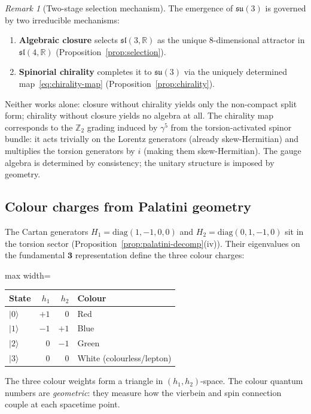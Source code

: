 \documentclass[12pt,a4paper]{article}
\theoremstyle{plain}
\theoremstyle{definition}
\theoremstyle{remark}
\newtheorem{remark}[theorem]{Remark}
\begin{document}
\begin{remark}[Two-stage selection mechanism]\label{rem:two-stage}
The emergence of $\mathfrak{su}(3)$ is governed by two irreducible mechanisms:
\begin{enumerate}[label=(\arabic*),noitemsep]
  \item \textbf{Algebraic closure} selects $\mathfrak{sl}(3,\mathbb{R})$ as the
    unique 8-dimensional attractor in $\mathfrak{sl}(4,\mathbb{R})$
    (Proposition~\ref{prop:selection}).
  \item \textbf{Spinorial chirality} completes it to $\mathfrak{su}(3)$ via the
    uniquely determined map~\eqref{eq:chirality-map}
    (Proposition~\ref{prop:chirality}).
\end{enumerate}
Neither works alone: closure without chirality yields only the non-compact
split form; chirality without closure yields no algebra at all.
The chirality map corresponds to the $\mathbb{Z}_2$ grading induced by
$\gamma^5$ from the torsion-activated spinor bundle: it acts trivially on the
Lorentz generators (already skew-Hermitian) and multiplies the torsion generators
by $i$ (making them skew-Hermitian).  The gauge algebra is determined by
consistency; the unitary structure is imposed by geometry.
\end{remark}

\subsection{Colour charges from Palatini geometry}

The Cartan generators $H_1 = \mathrm{diag}(1,-1,0,0)$ and
$H_2 = \mathrm{diag}(0,1,-1,0)$ sit in the torsion sector
(Proposition~\ref{prop:palatini-decomp}(iv)).
Their eigenvalues on the fundamental $\mathbf{3}$ representation
define the three colour charges:
\begin{center}
\begin{adjustbox}{max width=\linewidth}\begin{tabular}{lrrl}
\toprule
State & $h_1$ & $h_2$ & Colour \\
\midrule
$|0\rangle$ & $+1$ & $0$ & Red \\
$|1\rangle$ & $-1$ & $+1$ & Blue \\
$|2\rangle$ & $0$ & $-1$ & Green \\
$|3\rangle$ & $0$ & $0$ & White (colourless/lepton) \\
\bottomrule
\end{tabular}\end{adjustbox}
\end{center}
The three colour weights form a triangle in $(h_1, h_2)$-space.
The colour quantum numbers are \emph{geometric}: they measure
how the vierbein and spin connection couple at each spacetime point.
\end{document}
